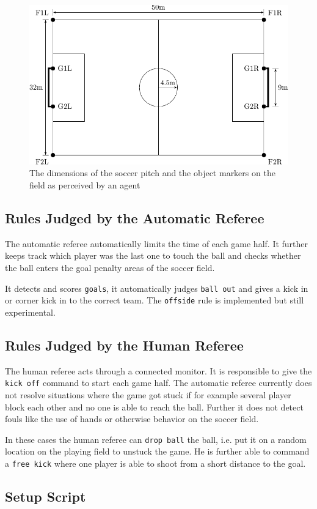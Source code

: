 \begin{figure}[htp]
  \centering
  \includegraphics[width=\textwidth]{fig/pitch}
  \caption{The dimensions of the soccer pitch and the object markers on the field as perceived by an agent}
  \label{fig:pitch}
\end{figure}

\subsection{Rules Judged by the Automatic Referee}

The automatic referee automatically limits the time of each game
half. It further keeps track which player was the last one to touch
the ball and checks whether the ball enters the goal penalty areas of
the soccer field. 

It detects and scores \texttt{goals}, it automatically judges
\texttt{ball out} and gives a kick in or corner kick in to the correct team. 
The \texttt{offside} rule is implemented but still experimental.

\subsection{Rules Judged by the Human Referee}

The human referee acts through a connected monitor. It is responsible
to give the \texttt{kick off} command to start each game half. The
automatic referee currently does not resolve situations where the game
got stuck if for example several player block each other and no one is
able to reach the ball. Further it does not detect fouls like the use
of hands or otherwise behavior on the soccer field.

In these cases the human referee can \texttt{drop ball} the ball,
i.e. put it on a random location on the playing field to unstuck the
game. He is further able to command a \texttt{free kick} where one
player is able to shoot from a short distance to the goal.

\subsection{Setup Script}


